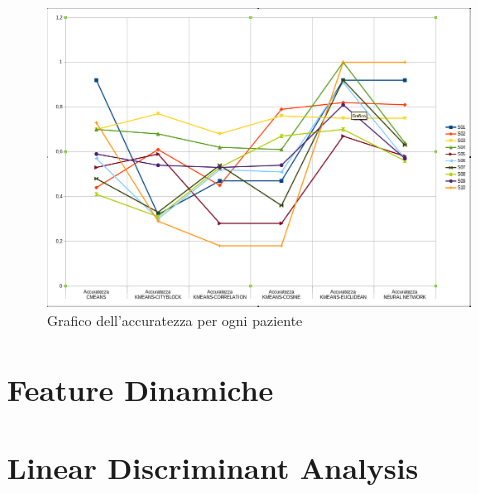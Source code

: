 \begin{figure}[]
	\centering
	\includegraphics[scale=0.35]{images/accuratezza.png}
	\caption{Grafico dell'accuratezza per ogni paziente}
	\label{Accuratezza}
\end{figure}
\section{Feature Dinamiche}


\section{Linear Discriminant Analysis}












